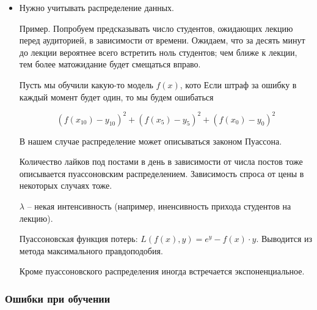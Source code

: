 \documentclass[main.tex]{subfiles}
\begin{document}
\begin{itemize}[noitemsep]
	\item Нужно учитывать распределение данных. %

	Пример.
	Попробуем предсказывать число студентов, ожидающих лекцию перед аудиторией, в зависимости от времени.
	Ожидаем, что за десять минут до лекции вероятнее всего встретить ноль студентов; чем ближе к лекции, тем более матожидание будет смещаться вправо.

	Пусть мы обучили какую-то модель $ f(x) $, кото %
	Если штраф за ошибку в каждый момент будет один, то мы будем ошибаться %

	\[ (f(x_{10}) - y_{10})^2 + (f(x_{5}) - y_{5})^2 + (f(x_{0}) - y_{0})^2 \]

	В нашем случае распределение может описываться законом Пуассона.

	Количество лайков под постами в день в зависимости от числа постов тоже описывается пуассоновским распределением.
	Зависимость спроса от цены в некоторых случаях тоже.

	$ \lambda $ -- некая интенсивность (например, иненсивность прихода студентов на лекцию).

	Пуассоновская функция потерь: $ L(f(x),y) = e^y - f(x) \cdot y $.
	Выводится из метода максимального правдоподобия.

	Кроме пуассоновского распределения иногда встречается экспоненциальное.

\end{itemize}

\subsubsection{Ошибки при обучении}
\end{document}
